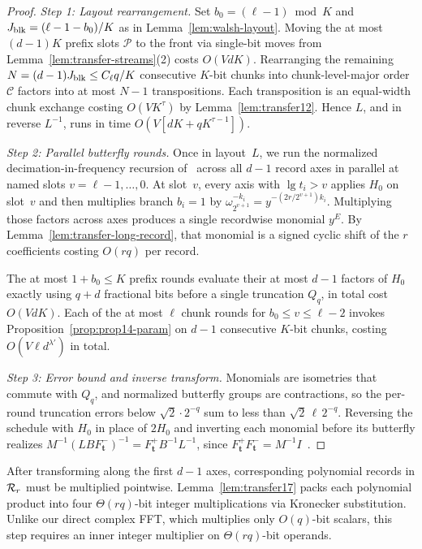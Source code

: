 \begin{proof}
\emph{Step 1: Layout rearrangement.}
Set $b_0=(\ell-1)\bmod K$ and $J_{\rm blk}=(\ell-1-b_0)/K$ as in Lemma~\ref{lem:walsh-layout}. Moving the at most $(d-1)K$ prefix slots $\mathcal P$ to the front via single-bit moves from Lemma~\ref{lem:transfer-streams}(2) costs $O(VdK)$. Rearranging the remaining $N=(d-1)J_{\rm blk}\le C_\ell q/K$ consecutive $K$-bit chunks into chunk-level-major order $\mathcal C$ factors into at most $N-1$ transpositions. Each transposition is an equal-width chunk exchange costing $O(VK^\tau)$ by Lemma~\ref{lem:transfer12}. Hence $L$, and in reverse $L^{-1}$, runs in time $O(V[dK+qK^{\tau-1}])$.

\emph{Step 2: Parallel butterfly rounds.}
Once in layout~$L$, we run the normalized decimation-in-frequency recursion of~\cite[\S6.1, (27)]{OAI26} across all $d-1$ record axes in parallel at named slots $v=\ell-1,\dots,0$. At slot~$v$, every axis with $\lg t_i>v$ applies $H_0$ on slot~$v$ and then multiplies branch $b_i=1$ by $\omega_{2^{v+1}}^{-k_i}=y^{-(2r/2^{v+1})k_i}$. Multiplying those factors across axes produces a single recordwise monomial $y^E$. By Lemma~\ref{lem:transfer-long-record}, that monomial is a signed cyclic shift of the $r$ coefficients costing $O(rq)$ per record.

The at most $1+b_0\le K$ prefix rounds evaluate their at most $d-1$ factors of $H_0$ exactly using $q+d$ fractional bits before a single truncation $Q_q$, in total cost $O(VdK)$. Each of the at most $\ell$ chunk rounds for $b_0\le v\le\ell-2$ invokes Proposition~\ref{prop:prop14-param} on $d-1$ consecutive $K$-bit chunks, costing $O(V\ell d^{\lambda'})$ in total.

\emph{Step 3: Error bound and inverse transform.}
Monomials are isometries that commute with $Q_q$, and normalized butterfly groups are contractions, so the per-round truncation errors below $\sqrt2\cdot2^{-q}$ sum to less than $\sqrt2\,\ell\,2^{-q}$. Reversing the schedule with $H_0$ in place of $2H_0$ and inverting each monomial before its butterfly realizes $M^{-1}(LBF^-_{\mathbf t})^{-1}=F^+_{\mathbf t}B^{-1}L^{-1}$, since $F^+_{\mathbf t}F^-_{\mathbf t}=M^{-1}I$~\cite[Lemma~15, \S6.1]{OAI26}.
\end{proof}

After transforming along the first $d-1$ axes, corresponding polynomial records in $\mathcal{R}_r$ must be multiplied pointwise. Lemma~\ref{lem:transfer17} packs each polynomial product into four $\Theta(rq)$-bit integer multiplications via Kronecker substitution. Unlike our direct complex FFT, which multiplies only $O(q)$-bit scalars, this step requires an inner integer multiplier on $\Theta(rq)$-bit operands.

